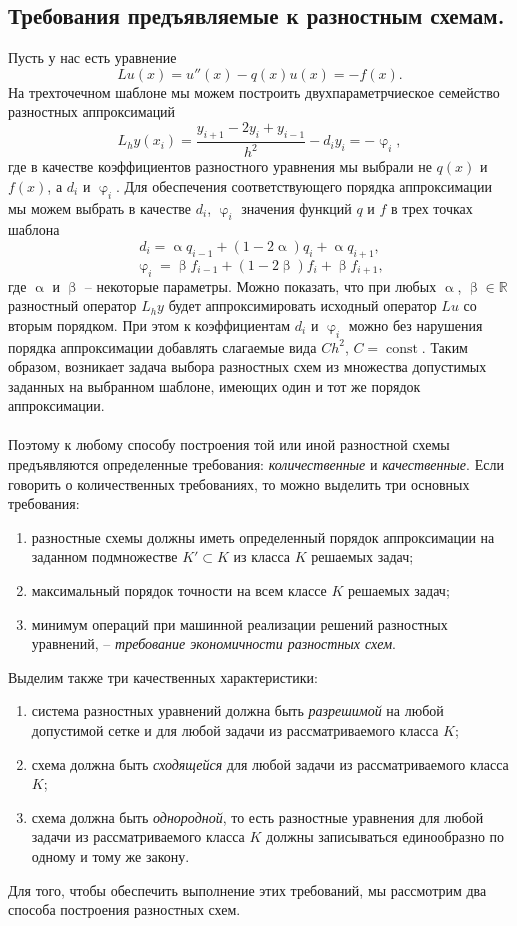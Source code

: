 \documentclass[a4paper, 12pt]{report}
\numberwithin{equation}{section}
\renewcommand{\alpha}{\upalpha}
\renewcommand{\beta}{\upbeta}
\renewcommand{\varphi}{\upvarphi}
\newcommand{\const}{\operatorname{const}}
\begin{document}
\subsection{Требования предъявляемые к разностным схемам.}
Пусть у нас есть уравнение
$$Lu(x) = u''(x) - q(x) u(x) = -f(x).$$
На трехточечном шаблоне мы можем построить двухпараметрчиеское семейство разностных аппроксимаций
$$L_hy(x_i) = \dfrac{y_{i+1} - 2y_i + y_{i-1}}{h^2} - d_iy_i = -\varphi_i,$$
где в качестве коэффициентов разностного уравнения мы выбрали не $q(x)$ и $f(x)$, а $d_i$ и $\varphi_i$.
Для обеспечения соответствующего порядка аппроксимации мы можем выбрать в качестве $d_i$, $\varphi_i$ значения функций $q$ и $f$ в трех точках шаблона
$$d_i = \alpha q_{i-1} + (1-2\alpha)q_i + \alpha q_{i+1},$$
$$\varphi_i = \beta f_{i-1} + (1-2\beta)f_i + \beta f_{i+1},$$
где $\alpha$ и $\beta$ -- некоторые параметры.
Можно показать, что при любых $\alpha$, $\beta\in \mathbb R$ разностный оператор $L_hy$ будет аппроксимировать исходный оператор $Lu$ со вторым порядком. При этом к коэффициентам $d_i$ и $\varphi_i$ можно без нарушения порядка аппроксимации добавлять слагаемые вида $Ch^2$, $C = \const$. Таким образом, возникает задача выбора разностных схем из множества допустимых заданных на выбранном шаблоне, имеющих один и тот же порядок аппроксимации.\\\\
Поэтому к любому способу построения той или иной разностной схемы предъявляются определенные требования: \textit{количественные} и \textit{качественные}. Если говорить о количественных требованиях, то можно выделить три основных требования:
	\begin{enumerate}
		\item разностные схемы должны иметь определенный порядок аппроксимации на заданном подмножестве $K' \subset K$ из класса $K$ решаемых задач;
		\item максимальный порядок точности на всем классе $K$ решаемых задач;
		\item минимум операций при машинной реализации решений разностных уравнений, -- \textit{требование экономичности разностных схем}.
	\end{enumerate}
	Выделим также три качественных характеристики:
	\begin{enumerate}
		\item система разностных уравнений должна быть \textit{разрешимой} на любой допустимой сетке и для любой задачи из рассматриваемого класса $K$;
		\item схема должна быть \textit{сходящейся} для любой задачи из рассматриваемого класса $K$;
		\item схема должна быть \textit{однородной}, то есть разностные уравнения для любой задачи из рассматриваемого класса $K$ должны записываться единообразно по одному и тому же закону.
	\end{enumerate}
	Для того, чтобы обеспечить выполнение этих требований, мы рассмотрим два способа построения разностных схем. 
\end{document}
